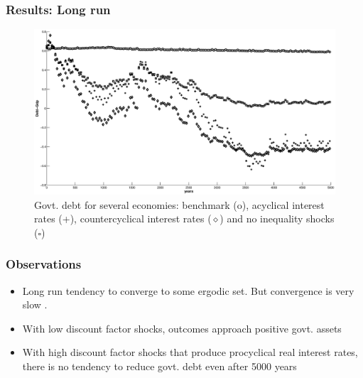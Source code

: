 \documentclass{beamer}
\begin{document}
\begin{frame}
 \frametitle{Results: Long run}

  \begin{figure}[htp]
 \centering
 \includegraphics[width=\textwidth]{Draft25Graphs/LongSimulations.eps}
 \caption{Govt. debt for several economies: benchmark (o), acyclical interest rates (+), countercyclical interest rates ($\diamond$) and no inequality shocks \scriptsize ($\square$\normalsize) }
 \label{fig:LongSimulations}
 \end{figure}


 \end{frame}

 \begin{frame}[label=main]
  \frametitle{Observations}
  \begin{itemize}
   \item Long run tendency to converge to some ergodic set. But convergence is very slow
   \hyperlink{convergence}{}.
   \item With low discount factor shocks, outcomes approach positive govt. assets
   \item With high discount factor shocks that produce procyclical real interest rates, there is no tendency to reduce govt. debt even after 5000 years
  \end{itemize}

 \end{frame}
\end{document}
